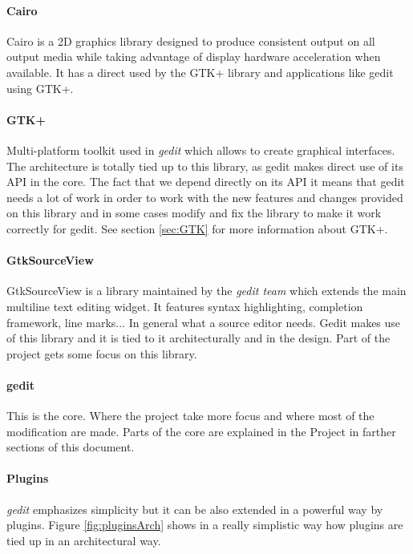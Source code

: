 \paragraph{Cairo}

Cairo is a 2D graphics library designed to produce consistent output on all output 
media while taking advantage of display hardware acceleration when available. It 
has a direct used by the GTK+ library and applications like gedit using GTK+.

\paragraph{GTK+}

Multi-platform toolkit used in \emph{gedit} which allows to create graphical interfaces.
The architecture is totally tied up to this library, as gedit makes direct use of its 
API in the core. The fact that we depend directly on its API it means that gedit 
needs a lot of work in order to work with the new features and changes provided 
on this library and in some cases modify and fix the library to make it work correctly 
for gedit. See section \ref{sec:GTK} for more information about GTK+.

\paragraph{GtkSourceView}

GtkSourceView is a library maintained by the \emph{gedit team} which extends the main 
multiline text editing widget. It features syntax highlighting, completion framework, 
line marks... In general what a source editor needs. Gedit makes use of this library 
and it is tied to it architecturally and in the design. Part of the project gets some 
focus on this library.

\paragraph{gedit}

This is the core. Where the project take more focus and where most of the modification 
are made. Parts of the core are explained in the Project in farther sections of this 
document.

\paragraph{Plugins}

\emph{gedit} emphasizes simplicity but it can be also extended in a powerful way 
by plugins. Figure \ref{fig:pluginsArch} shows in a really simplistic way how plugins 
are tied up in an architectural way.

